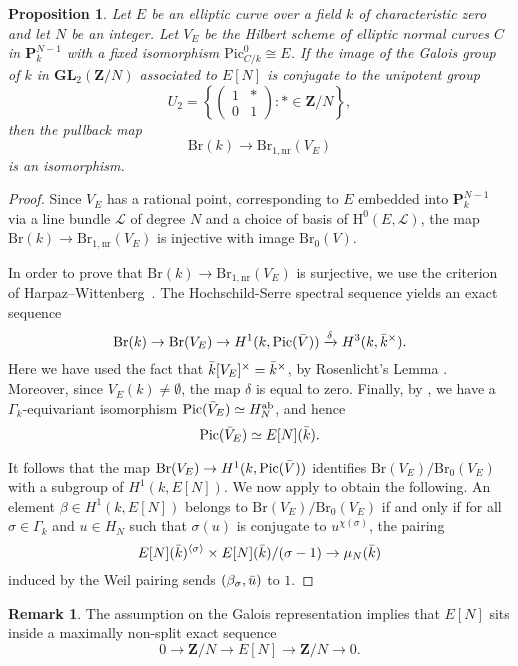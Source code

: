 \documentclass[10pt,letterpaper,twoside]{article}
\newcommand{\Lscr}{\mathcal{L}}
\renewcommand{\H}{\mathrm{H}}
\renewcommand{\1}{\mathbf{1}}
\newcommand{\bP}{\mathbf{P}}
\newcommand{\bZ}{\mathbf{Z}}
\newcommand{\nr}{\mathrm{nr}}
\newcommand{\GL}{\mathbf{GL}}
\newcommand{\Pic}{\mathrm{Pic}}
\newcommand{\Br}{\mathrm{Br}}
\newcommand{\iso}{\cong}
\theoremstyle{plain}
\newtheorem{proposition}[theorem]{Proposition}
\theoremstyle{plain}
\theoremstyle{definition}
\theoremstyle{named}
\theoremstyle{definition}
\newtheorem{remark}[theorem]{Remark}
\begin{document}
	\begin{proposition}
		Let $E$ be an elliptic curve over a field $k$ of characteristic zero and let $N$ be an integer. Let $V_E$ be the
		Hilbert scheme of elliptic normal curves $C$ in $\bP^{N-1}_k$
		with a fixed isomorphism $\Pic_{C/k}^0\iso E$. 
		If the image of the Galois group of $k$ in $\GL_2(\bZ/N)$ associated to $E[N]$
		is conjugate to the unipotent group $$U_2=\left\{\begin{pmatrix}1&*\\0&1\end{pmatrix}\colon
		*\in\bZ/N\right\},$$ then the pullback map $$\Br(k)\rightarrow\Br_{1,\nr}(V_E)$$
		is an isomorphism.
	\end{proposition}
	
	\begin{proof}
		Since $V_E$ has a rational point, corresponding to $E$ embedded into $\bP^{N-1}_k$
		via a line bundle $\Lscr$ of degree $N$ and a choice of basis of $\H^0(E,\Lscr)$, the map
		$\Br(k)\rightarrow\Br_{1,\nr}(V_E)$ is injective with image $\Br_0(V)$. 
		
		In order to prove that $\Br(k)\rightarrow\Br_{1,\nr}(V_E)$ is surjective, we use the criterion of
		Harpaz--Wittenberg~\cite{harpaz-wittenberg-massey}. The Hochschild-Serre spectral sequence yields an exact sequence
		\[\Br(k)\to \Br(V_E)\to H^1(k,\Pic(\Bar{V}))\xrightarrow{\delta}H^3(k,\Bar{k}^\times).\]
		Here we have used the fact that $\Bar{k}[V_E]^\times=\Bar{k}^\times$, by Rosenlicht's Lemma \cite{}. Moreover, since $V_E(k)\neq \emptyset$, the map $\delta$ is equal to zero. Finally, by \cite{}, we have a $\Gamma_k$-equivariant isomorphism $\Pic(\Bar{V}_E)\simeq H^{\mathrm{ab}}_N$, and hence
		\[\Pic(\Bar{V}_E)\simeq E[N](\Bar{k}).\]
		
		It follows that the map $\Br(V_E)\to H^1(k,\Pic(\Bar{V}))$ identifies $\Br(V_E)/\Br_0(V_E)$ with a subgroup of $H^1(k,E[N])$. We now apply \cite[Proposition 3.3]{harpaz-wittenberg-massey} to obtain the following. An element $\beta\in H^1(k,E[N])$ belongs to $\Br(V_E)/\Br_0(V_E)$ if and only if for all $\sigma\in \Gamma_k$ and $u\in H_N$ such that $\sigma(u)$ is conjugate to $u^{\chi(\sigma)}$, the pairing
		\[E[N](\Bar{k})^{\langle\sigma\rangle}\times E[N](\Bar{k})/(\sigma-1)\to \mu_N(\Bar{k})\]
		induced by the Weil pairing sends $(\beta_{\sigma},\Bar{u})$ to $1$. 
	\end{proof}
	
	\begin{remark}
		The assumption on the Galois representation implies that $E[N]$ sits inside a maximally non-split exact sequence
		$$0\rightarrow\bZ/N\rightarrow E[N]\rightarrow\bZ/N\rightarrow 0.$$
	\end{remark}
	
\end{document}
